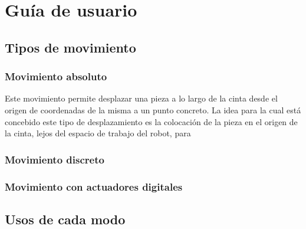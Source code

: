 \chapter*{Guía de usuario}
\pagestyle{especial}
{}

\section{Tipos de movimiento}

\subsection{Movimiento absoluto}

Este movimiento permite desplazar una pieza a lo largo de la cinta desde el origen de coordenadas de la misma a un punto concreto. La idea para la cual está concebido este tipo de desplazamiento es la colocación de la pieza en el origen de la cinta, lejos del espacio de trabajo del robot, para 

\subsection{Movimiento discreto}

\subsection{Movimiento con actuadores digitales}

\section{Usos de cada modo}